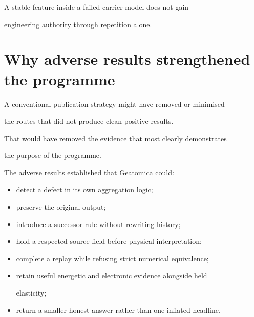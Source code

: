 \documentclass[11pt,a4paper,oneside]{report}
\begin{document}
A stable feature inside a failed carrier model does not gain

engineering authority through repetition alone.





\section{Why adverse results strengthened the programme}



A conventional publication strategy might have removed or minimised

the routes that did not produce clean positive results.



That would have removed the evidence that most clearly demonstrates

the purpose of the programme.



The adverse results established that Geatomica could:



\begin{itemize}



\item

detect a defect in its own aggregation logic;



\item

preserve the original output;



\item

introduce a successor rule without rewriting history;



\item

hold a respected source field before physical interpretation;



\item

complete a replay while refusing strict numerical equivalence;



\item

retain useful energetic and electronic evidence alongside held

elasticity;



\item

return a smaller honest answer rather than one inflated headline.



\end{itemize}
\end{document}
